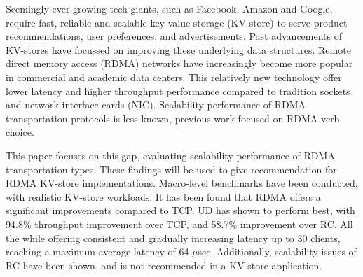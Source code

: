 


\begin{abstracts}        %

    Seemingly ever growing tech giants, such as Facebook, Amazon and Google, require fast, reliable and scalable key-value storage (KV-store) to serve product recommendations, user preferences, and advertisements.
    Past advancements of KV-stores have focussed on improving these underlying data structures.
    Remote direct memory access (RDMA) networks have increasingly become more popular in commercial and academic data centers.
    This relatively new technology offer lower latency and higher throughput performance compared to tradition sockets and network interface cards (NIC).
    Scalability performance of RDMA transportation protocols is less known, previous work focused on RDMA verb choice.

    This paper focuses on this gap, evaluating scalability performance of RDMA transportation types.
    These findings will be used to give recommendation for RDMA KV-store implementations.
    Macro-level benchmarks have been conducted, with realistic KV-store workloads.
    It has been found that RDMA offers a significant improvements compared to TCP.
    UD has shown to perform best, with 94.8\% throughput improvement over TCP, and 58.7\% improvement over RC.
    All the while offering consistent and gradually increasing latency up to 30 clients, reaching a maximum average latency of 64 $\mu$sec.
    Additionally, scalability issues of RC have been shown, and is not recommended in a KV-store application.

\end{abstracts}


